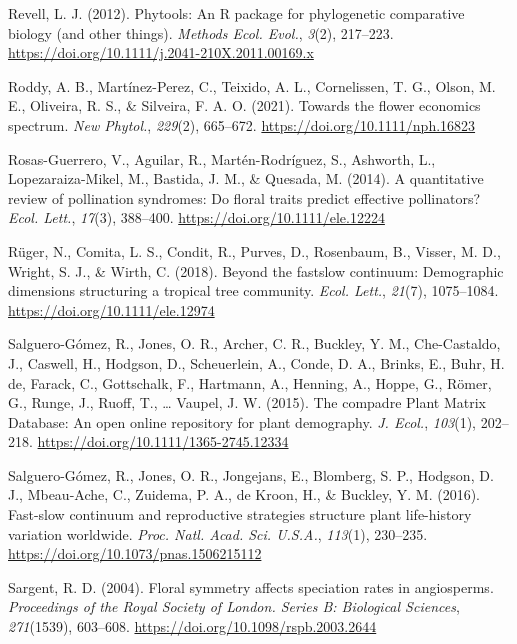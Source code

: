 \documentclass[
  12pt,
  a4paper,
]{article}
\newlength{\cslhangindent}
\newlength{\cslentryspacingunit} %
\newenvironment{CSLReferences}[2] %
 {%
  \setlength{\parindent}{0pt}
  \ifodd #1
  \let\oldpar\par
  \def\par{\hangindent=\cslhangindent\oldpar}
  \fi
  \setlength{\parskip}{#2\cslentryspacingunit}
 }%
 {}
\begin{document}
\begin{CSLReferences}{1}{0}
\leavevmode{}%
Revell, L. J. (2012). Phytools: An {R} package for phylogenetic comparative biology (and other things). \emph{Methods Ecol. Evol.}, \emph{3}(2), 217--223. \url{https://doi.org/10.1111/j.2041-210X.2011.00169.x}

\leavevmode{}%
Roddy, A. B., Martínez-Perez, C., Teixido, A. L., Cornelissen, T. G., Olson, M. E., Oliveira, R. S., \& Silveira, F. A. O. (2021). Towards the flower economics spectrum. \emph{New Phytol.}, \emph{229}(2), 665--672. \url{https://doi.org/10.1111/nph.16823}

\leavevmode{}%
Rosas-Guerrero, V., Aguilar, R., Martén-Rodríguez, S., Ashworth, L., Lopezaraiza-Mikel, M., Bastida, J. M., \& Quesada, M. (2014). A quantitative review of pollination syndromes: Do floral traits predict effective pollinators? \emph{Ecol. Lett.}, \emph{17}(3), 388--400. \url{https://doi.org/10.1111/ele.12224}

\leavevmode{}%
Rüger, N., Comita, L. S., Condit, R., Purves, D., Rosenbaum, B., Visser, M. D., Wright, S. J., \& Wirth, C. (2018). Beyond the fast\textendash slow continuum: Demographic dimensions structuring a tropical tree community. \emph{Ecol. Lett.}, \emph{21}(7), 1075--1084. \url{https://doi.org/10.1111/ele.12974}

\leavevmode{}%
Salguero-Gómez, R., Jones, O. R., Archer, C. R., Buckley, Y. M., Che-Castaldo, J., Caswell, H., Hodgson, D., Scheuerlein, A., Conde, D. A., Brinks, E., Buhr, H. de, Farack, C., Gottschalk, F., Hartmann, A., Henning, A., Hoppe, G., Römer, G., Runge, J., Ruoff, T., \ldots{} Vaupel, J. W. (2015). The compadre {Plant Matrix Database}: An open online repository for plant demography. \emph{J. Ecol.}, \emph{103}(1), 202--218. \url{https://doi.org/10.1111/1365-2745.12334}

\leavevmode{}%
Salguero-Gómez, R., Jones, O. R., Jongejans, E., Blomberg, S. P., Hodgson, D. J., Mbeau-Ache, C., Zuidema, P. A., de Kroon, H., \& Buckley, Y. M. (2016). Fast-slow continuum and reproductive strategies structure plant life-history variation worldwide. \emph{Proc. Natl. Acad. Sci. U.S.A.}, \emph{113}(1), 230--235. \url{https://doi.org/10.1073/pnas.1506215112}

\leavevmode{}%
Sargent, R. D. (2004). Floral symmetry affects speciation rates in angiosperms. \emph{Proceedings of the Royal Society of London. Series B: Biological Sciences}, \emph{271}(1539), 603--608. \url{https://doi.org/10.1098/rspb.2003.2644}


\end{CSLReferences}
\end{document}
